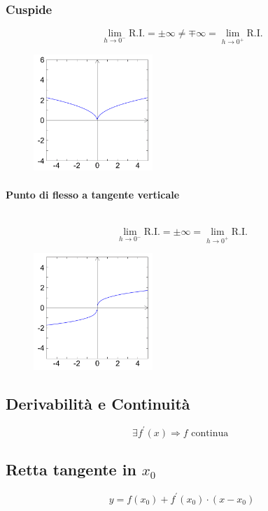 \documentclass{report}
\newcommand{\subsubsubsection}[1]{\paragraph{#1}\mbox{}\\}
\begin{document}
        \subsubsection{Cuspide}
            $$\lim_{h \to 0^-} \textrm{R.I.} = \pm\infty \neq \mp\infty = \lim_{h \to 0^+} \textrm{R.I.}$$
            \begin{center}
                \begin{figure}[H]
                    \includegraphics[width = 0.4\textwidth, height = 0.4\textwidth]{cuspide.png}
                \end{figure}
            \end{center}
        \subsubsubsection{Punto di flesso a tangente verticale}
            $$\lim_{h \to 0^-} \textrm{R.I.} = \pm\infty = \lim_{h \to 0^+} \textrm{R.I.}$$
            \begin{center}
                \begin{figure}[H]
                    \includegraphics[width = 0.4\textwidth, height = 0.4\textwidth]{puntoflesso.png}
                \end{figure}
            \end{center}
    \subsection{Derivabilità e Continuità}
        $$\exists f^{'}\left(x\right) \Longrightarrow f \textrm{ continua }$$
    \subsection{Retta tangente in $x_0$}
        $$y = f\left(x_0\right) +f^{'}\left(x_0\right) \cdot \left(x - x_0\right)$$
\end{document}
